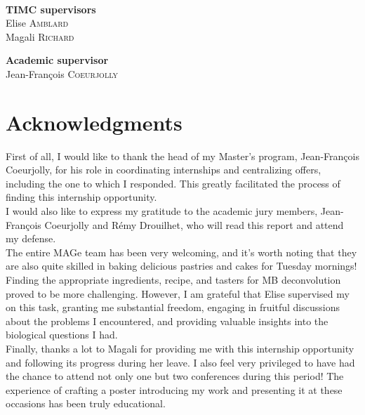 \documentclass{article}
\makeatletter
\let\theauthor\@author
\makeatother
\begin{document}
\begin{titlepage}
\begin{center}
    	{\Large \theauthor}\\[1.5 cm]
    \end{center}

    \noindent
	\begin{minipage}{0.5\textwidth}
        \RaggedRight \large
        \textbf{TIMC supervisors} \\
        Elise \textsc{Amblard} \\
        Magali \textsc{Richard}
	\end{minipage}
	\begin{minipage}{0.5\textwidth}
        \RaggedLeft \large
        \textbf{Academic supervisor} \\
        Jean-François \textsc{Coeurjolly}
	\end{minipage}
\end{titlepage}
\restoregeometry
\pagebreak

\section*{Acknowledgments}

First of all, I would like to thank the head of my Master's program, Jean-François Coeurjolly, for his role in coordinating internships and centralizing offers, including the one to which I responded. 
This greatly facilitated the process of finding this internship opportunity. \\
I would also like to express my gratitude to the academic jury members, Jean-François Coeurjolly and Rémy Drouilhet, who will read this report and attend my defense. \\

The entire MAGe team has been very welcoming, and it's worth noting that they are also quite skilled in baking delicious pastries and cakes for Tuesday mornings! \\
Finding the appropriate ingredients, recipe, and tasters for MB deconvolution proved to be more challenging.
However, I am grateful that Elise supervised my on this task, granting me substantial freedom, engaging in fruitful discussions about the problems I encountered, and providing valuable insights into the biological questions I had. \\

Finally, thanks a lot to Magali for providing me with this internship opportunity and following its progress during her leave.
I also feel very privileged to have had the chance to attend not only one but two conferences during this period! 
The experience of crafting a poster introducing my work and presenting it at these occasions has been truly educational.
\end{document}
